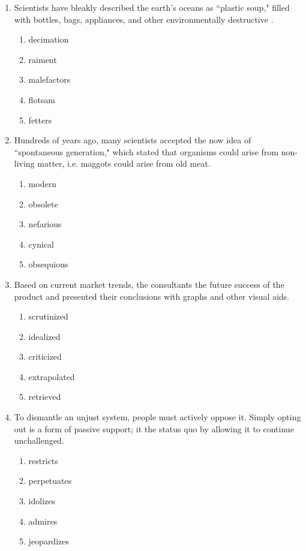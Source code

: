 \begin{enumerate}
\bigskip
\item Scientists have bleakly described the earth's oceans as ``plastic soup," filled with bottles, bags, appliances, and other environmentally destructive \longline.
\begin{enumerate}[label=(\Alph*)]
\item decimation
\item raiment
\item malefactors
\item flotsam
\item fetters
\end{enumerate}

\bigskip
\item Hundreds of years ago, many scientists accepted the now \longline idea of ``spontaneous generation," which stated that organisms could arise from non-living matter, i.e. maggots could arise from old meat.

\begin{enumerate}[label=(\Alph*)]
\item modern
\item obsolete
\item nefarious
\item cynical
\item obsequious
\end{enumerate}

\bigskip
\item Based on current market trends, the consultants \longline the future success of the product and presented their conclusions with graphs and other visual aids.
\begin{enumerate}[label=(\Alph*)]
\item scrutinized
\item idealized
\item criticized
\item extrapolated
\item retrieved
\end{enumerate}

\bigskip
\item To dismantle an unjust system, people must actively oppose it.  Simply opting out is a form of passive support; it \longline the status quo by allowing it to continue unchallenged.
\begin{enumerate}[label=(\Alph*)]
\item restricts
\item perpetuates
\item idolizes
\item admires
\item jeopardizes
\end{enumerate}


\end{enumerate}
